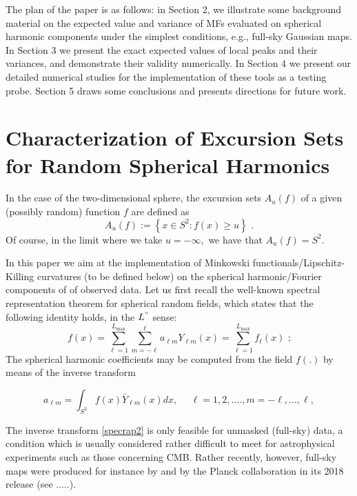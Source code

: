 \documentclass[aps,prd,showpacs,superscriptaddress,groupedaddress]{revtex4-1}  %
\begin{document}
The plan of the paper is as follows: in Section 2, we illustrate some background material on the expected value and variance of MFs evaluated on spherical harmonic components under the simplest conditions, e.g., full-sky Gaussian maps. In Section 3 we present the exact expected values of local peaks and their variances, and demonstrate their validity numerically. In Section 4 we present our detailed numerical studies for the implementation of these tools as a testing probe. Section 5 draws some conclusions and presents directions for future work.

\section{Characterization of Excursion Sets for Random Spherical Harmonics}

In the case of the two-dimensional sphere, the excursion sets $A_{u}(f)$ of a given (possibly random)
function $f$ are defined as
\begin{equation}
A_{u}(f):=\left\{ x\in S^{2}:f(x)\geq u\right\} \text{ .}
\end{equation}
Of course, in the limit where we take $u=-\infty ,$ we have that $%
A_{u}(f)=S^{2}$.

In this paper we aim at the implementation of Minkowski functionals/Lipschitz-Killing curvatures (to be defined below) on the spherical harmonic/Fourier components of of observed data. Let us first recall the well-known spectral representation theorem for spherical random fields, which states that the following identity holds, in the $L^"$ sense:
\begin{equation}
f(x)=\sum_{\ell =1}^{L_{\max }}\sum_{m=-\ell }^{\ell }a_{\ell m}Y_{\ell
m}(x)=\sum_{\ell =1}^{L_{\max }}f_{\ell }(x)\text{ ;}  \label{specrap}
\end{equation}%
The spherical harmonic coefficients may be computed from the field $f(.)$ by means of the inverse transform

\begin{equation}
a_{\ell m}= \int_{S^2} f(x) \bar{Y}_{\ell
m}(x)dx, \text{ } \text{ } \ell =1,2,...., m=-\ell,...,\ell ,   \label{specrap2}
\end{equation}%

The inverse transform \eqref{specrap2} is only feasible for unmasked (full-sky) data, a condition which is usually considered rather difficult to meet for astrophysical experiments such as those concerning CMB. Rather recently, however, full-sky maps were produced for instance by \cite{starketal2014} and by the Planck collaboration in its 2018 release (see .....). 
\end{document}

